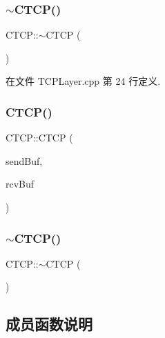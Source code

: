 \subsubsection{\texorpdfstring{$\sim$\+C\+T\+C\+P()}{~CTCP()}\hspace{0.1cm}{\footnotesize\ttfamily [1/2]}}
{\footnotesize\ttfamily C\+T\+C\+P\+::$\sim$\+C\+T\+CP (\begin{DoxyParamCaption}{ }\end{DoxyParamCaption})}



在文件 T\+C\+P\+Layer.\+cpp 第 24 行定义.

\mbox{\label{class_c_t_c_p_a7dee32e3cae74e448df0b4d09fea3d43}} 
\subsubsection{\texorpdfstring{C\+T\+C\+P()}{CTCP()}\hspace{0.1cm}{\footnotesize\ttfamily [2/2]}}
{\footnotesize\ttfamily C\+T\+C\+P\+::\+C\+T\+CP (\begin{DoxyParamCaption}\item[{\hyperlink{class_msg_list}{Msg\+List} \&}]{send\+Buf,  }\item[{\hyperlink{class_msg_list}{Msg\+List} \&}]{rcv\+Buf }\end{DoxyParamCaption})}

\mbox{\label{class_c_t_c_p_a5481af8e2b94bd236b2673eae11d160f}} 
\subsubsection{\texorpdfstring{$\sim$\+C\+T\+C\+P()}{~CTCP()}\hspace{0.1cm}{\footnotesize\ttfamily [2/2]}}
{\footnotesize\ttfamily C\+T\+C\+P\+::$\sim$\+C\+T\+CP (\begin{DoxyParamCaption}{ }\end{DoxyParamCaption})}



\subsection{成员函数说明}
\mbox{\label{class_c_t_c_p_a0c68800a3b6317cbe74aa2cb28ea3d9c}} 
